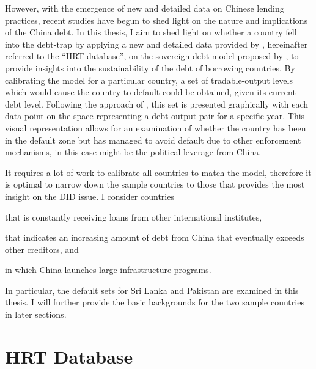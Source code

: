 However, with the emergence of new and detailed data on Chinese lending practices, recent studies have begun to shed light on the nature and implications of the China debt.
In this thesis, I aim to shed light on whether a country fell into the debt-trap by applying a new and detailed data provided by \citet*{Horn-Reinhart-Trebesch-21}, hereinafter referred to the ``HRT database'', on the sovereign debt model proposed by \citet*{Na-18}, to provide insights into the sustainability of the debt of borrowing countries.
By calibrating the model for a particular country, a set of tradable-output levels which would cause the country to default could be obtained, given its current debt level. Following the approach of \citet{Hinrichsen_2020-chapter4}, this set is presented graphically with each data point on the space representing a debt-output pair for a specific year. This visual representation allows for an examination of whether the country has been in the default zone but has managed to avoid default due to other enforcement mechanisms, in this case might be the political leverage from China.

It requires a lot of work to calibrate all countries to match the model, therefore it is optimal to narrow down the sample countries to those that provides the most insight on the DID issue. I consider countries
\begin{enumerate*}
    \item that is constantly receiving loans from other international institutes,
    \item that indicates an increasing amount of debt from China that eventually exceeds other creditors, and
    \item in which China launches large infrastructure programs.
\end{enumerate*}
In particular, the default sets for Sri Lanka and Pakistan are examined in this thesis. I will further provide the basic backgrounds for the two sample countries in later sections.

\section*{HRT Database}



